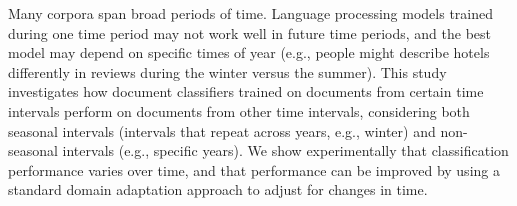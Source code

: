 Many corpora span broad periods of time. Language processing models trained during one time period may not work well in future time periods, and the best model may depend on specific times of year (e.g., people might describe hotels differently in reviews during the winter versus the summer). This study investigates how document classifiers trained on documents from certain time intervals perform on documents from other time intervals, considering both seasonal intervals (intervals that repeat across years, e.g., winter) and non-seasonal intervals (e.g., specific years). We show experimentally that classification performance varies over time, and that performance can be improved by using a standard domain adaptation approach to adjust for changes in time.
